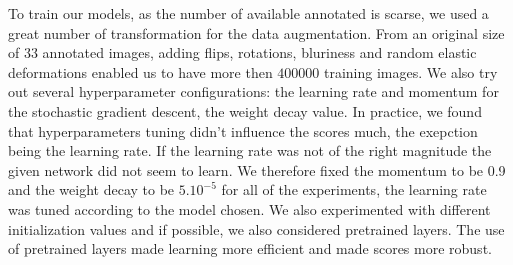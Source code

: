 \documentclass{article}
\begin{document}
To train our models, as the number of available annotated is scarse, we 
used a great number of transformation for the data augmentation. From 
an original size of 33 annotated images, adding flips, rotations, bluriness 
and random elastic deformations enabled us to have more then 
$400 000$ training images. 
We also try out several hyperparameter configurations: the learning rate and 
momentum for the stochastic gradient descent, the weight decay value.  
In practice, we found that hyperparameters tuning didn't influence the 
scores much, the exepction being the learning rate. If the learning rate 
was not of the right magnitude the given network did not seem to learn. 
We therefore fixed the momentum to be 0.9 and the weight decay to be 
$5.10^{-5}$ for all of the experiments, the learning rate was tuned 
according to the model chosen.
We also experimented with different 
initialization values and if possible, we also considered pretrained layers. 
The use of pretrained layers made learning more efficient and made scores 
more robust.
\end{document}
